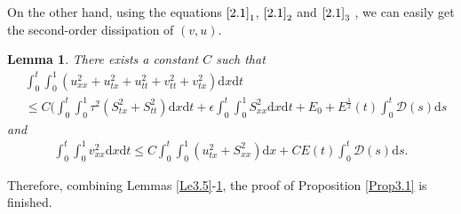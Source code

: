\documentclass[10pt,reqno]{amsart}
\numberwithin{equation}{section}
\newtheorem{lemma}[theorem]{Lemma}
\newcommand{\dif}{\mathrm{d}}
\begin{document}
On the other hand, using the equations $\eqref{2.1}_1$, $\eqref{2.1}_2$ and $\eqref{2.1}_3$ , we can easily get the second-order dissipation of $(v, u)$.
\begin{lemma}\label{Le3.11}
There exists a constant $C$ such that
\begin{align}
&\int_0^t\int_0^1 (u_{xx}^2+u_{tx}^2+u_{tt}^2+v_{tt}^2+v_{tx}^2)\dif x \dif t \nonumber \\
&\le C ( \int_0^t \int_0^1\tau^2 (S_{tx}^2+S_{tt}^2)\dif x\dif t+\epsilon \int_0^t\int_0^1 S_{xx}^2\dif x\dif t +E_0+E^\frac{1}{2}(t) \int_0^t \mathcal D(s)\dif s
 \label{3.31}
\end{align}
and
\begin{align}\label{3.32}
\int_0^t\int_0^1 v_{xx}^2\dif x \dif t \le C\int_0^t\int_0^1 (u_{tx}^2+S_{xx}^2)\dif x+CE (t)\int_0^t \mathcal D(s)\dif s.
\end{align}
\end{lemma}


Therefore, combining Lemmas \ref{Le3.5}-\ref{Le3.11}, the proof of Proposition \ref{Prop3.1} is finished.
\end{document}
